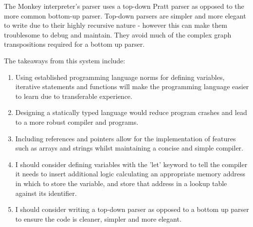 The Monkey interpreter's parser uses a top-down Pratt parser as opposed to the more common bottom-up parser.  Top-down parsers are simpler and more elegant to write due to their highly recursive nature - however this can make them troublesome to debug and maintain. They avoid much of the complex graph transpositions required for a bottom up parser.

The takeaways from this system include:
\begin{enumerate}
    \item Using established programming language norms for defining variables, iterative statements and functions will make the programming language easier to learn due to transferable experience.
    \item Designing a statically typed language would reduce program crashes and lead to a more robust compiler and programs.
    \item Including references and pointers allow for the implementation of features such as arrays and strings whilst maintaining a concise and simple compiler.
    \item I should consider defining variables with the 'let' keyword to tell the compiler it needs to insert additional logic calculating an appropriate memory address in which to store the variable, and store that address in a lookup table against its identifier.
    \item I should consider writing a top-down parser as opposed to a bottom up parser to ensure the code is cleaner, simpler and more elegant.
\end{enumerate}

